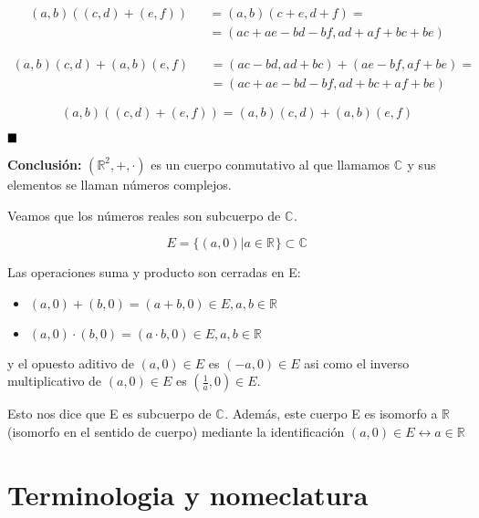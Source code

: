 \begin{eqnarray*}
  (a,b)((c,d)+(e,f)) & & = (a,b)(c+e,d+f) = \\
                     & & = (ac+ae-bd-bf,ad+af+bc+be)
\end{eqnarray*}

\begin{eqnarray*}
  (a,b)(c,d)+(a,b)(e,f) & & = (ac-bd,ad+bc)+(ae-bf,af+be) = \\
                        & & = (ac+ae-bd-bf, ad+bc+af+be)
\end{eqnarray*}

\[(a,b)((c,d)+(e,f)) = (a,b)(c,d)+(a,b)(e,f)\]

\(\hfill \blacksquare\)

\textbf{Conclusión:} \((\mathbb{R}^{2},+,\cdot)\) es un cuerpo conmutativo al que llamamos \(\mathbb{C}^{}\) y sus elementos se llaman números complejos.

Veamos que los números reales son subcuerpo de \(\mathbb{C}^{}\).

\[ E= \{(a,0) | a \in \mathbb{R}^{}\} \subset \mathbb{C}^{}\]

Las operaciones suma y producto son cerradas en E:

\begin{itemize}
  \item \((a,0) + (b,0) = (a+b, 0) \in E, a,b \in \mathbb{R}^{}\)
  \item \((a,0)\cdot(b,0) = (a\cdot b, 0) \in E, a,b \in \mathbb{R}^{}\)
\end{itemize}

y el opuesto aditivo de \( (a,0) \in E\) es \( (-a,0) \in E\) asi como el inverso multiplicativo de  \( (a,0) \in E\) es \( (\frac{1}{a},0) \in E\).

Esto nos dice que E es subcuerpo de \(\mathbb{C}^{}\). Además, este cuerpo E es isomorfo a \(\mathbb{R}^{}\) (isomorfo en el sentido de cuerpo) mediante la identificación \((a,0) \in E \leftrightarrow a \in \mathbb{R}^{}\)

\section{Terminologia y nomeclatura}

